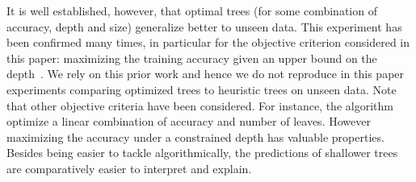 \documentclass{article}
\begin{document}

It is well established, however, that optimal trees (for some combination of accuracy, depth and size) generalize better to unseen data.
This experiment has been confirmed many times, in particular for the objective criterion considered in this paper: maximizing the training accuracy given an upper bound on the depth~\cite{avellanedaefficient,bertsimas2017optimal,bertsimas2007classification,DBLP:conf/ijcai/Hu0HH20,DBLP:journals/corr/abs-2007-12652,dl8}. We rely on this prior work and hence we do not reproduce in this paper experiments comparing optimized trees to heuristic trees on unseen data.
Note that other objective criteria have been considered. For instance, the algorithm \gosdt~\cite{NEURIPS2019_ac52c626} optimize a linear combination of accuracy and number of leaves. However maximizing the accuracy under a constrained depth has valuable properties.
Besides being easier to tackle algorithmically, the predictions of
 shallower trees are comparatively easier to interpret and explain. 


\end{document}
